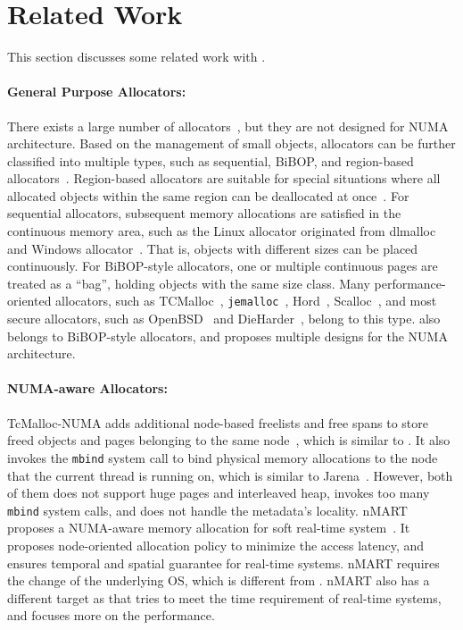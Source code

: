 \section{Related Work}

\label{sec:related}

This section discusses some related work with \NM{}. 

\paragraph{General Purpose Allocators:}
 There exists a large number of allocators~\cite{dlmalloc,Hoard,tcmalloc,jemalloc,Scalloc}, but they are not designed for NUMA architecture. Based on the management of small objects, allocators can be further classified into multiple types, such as sequential, BiBOP, and region-based allocators~\cite{Gay:1998:MME:277650.277748,  DieHarder}. Region-based allocators are suitable for special situations where all allocated objects within the same region can be deallocated at once~\cite{Gay:1998:MME:277650.277748}. For sequential allocators, subsequent memory allocations are satisfied in the continuous memory area, such as the Linux allocator originated from dlmalloc~\cite{dlmalloc} and Windows allocator~\cite{DieHarder}. That is, objects with different sizes can be placed continuously. For BiBOP-style allocators, one or multiple continuous pages are treated as a ``bag'', holding objects with the same size class. Many performance-oriented allocators, such as TCMalloc~\cite{tcmalloc}, \texttt{jemalloc}~\cite{jemalloc}, Hord~\cite{Hoard}, Scalloc~\cite{Scalloc}, and most secure allocators, such as OpenBSD~\cite{OpenBSD} and DieHarder~\cite{DieHarder}, belong to this type.  \NM{} also belongs to BiBOP-style allocators, and proposes multiple designs for the NUMA architecture. 

\paragraph{NUMA-aware Allocators:} TcMalloc-NUMA adds additional node-based freelists and free spans to store freed objects and pages belonging to the same node~\cite{tcmallocnew}, which is similar to \NM{}. It also invokes the \texttt{mbind} system call to bind physical memory allocations to the node that the current thread is running on, which is similar to Jarena~\cite{yang2019jarena}. However, both of them does not support huge pages and interleaved heap, invokes too many \texttt{mbind} system calls, and does not handle the metadata's locality. nMART proposes a NUMA-aware memory allocation for soft real-time system~\cite{kim2013node}. It proposes node-oriented allocation policy to minimize the access latency, and ensures temporal and spatial guarantee for real-time systems. nMART requires the change of the underlying OS, which is different from \NM{}. nMART also has a different target as \NM{} that tries to meet the time requirement of real-time systems, and \NM{} focuses more on the performance.


